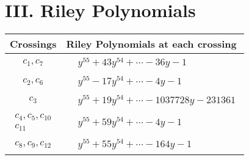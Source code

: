 \documentclass[1p]{elsarticle_modified}
\theoremstyle{definition}
\begin{document}
\centering \section*{ III. Riley Polynomials}
\begin{tabular}{m{50pt}|m{274pt}}
Crossings & \hspace{64pt}Riley Polynomials at each crossing \\
\hline $$\begin{aligned}c_{1},c_{7}\end{aligned}$$&$\begin{aligned}
&y^{55}+43 y^{54}+\cdots-36 y-1
\end{aligned}$\\
\hline $$\begin{aligned}c_{2},c_{6}\end{aligned}$$&$\begin{aligned}
&y^{55}-17 y^{54}+\cdots-4 y-1
\end{aligned}$\\
\hline $$\begin{aligned}c_{3}\end{aligned}$$&$\begin{aligned}
&y^{55}+19 y^{54}+\cdots-1037728 y-231361
\end{aligned}$\\
\hline $$\begin{aligned}c_{4},c_{5},c_{10}\\c_{11}\end{aligned}$$&$\begin{aligned}
&y^{55}+59 y^{54}+\cdots-4 y-1
\end{aligned}$\\
\hline $$\begin{aligned}c_{8},c_{9},c_{12}\end{aligned}$$&$\begin{aligned}
&y^{55}+55 y^{54}+\cdots-164 y-1
\end{aligned}$\\
\hline
\end{tabular}
\vskip 2pc
\end{document}
